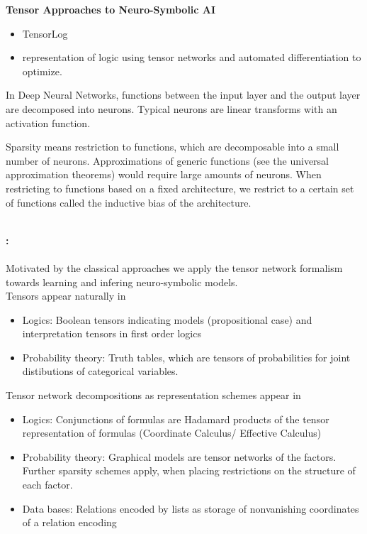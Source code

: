 \textbf{Tensor Approaches to Neuro-Symbolic AI}
\begin{itemize}
    \item TensorLog \cite{cohen_tensorlog_2020}
    \item \cite{badreddine_logic_2022} representation of logic using tensor networks and automated differentiation to optimize.
\end{itemize}

In Deep Neural Networks, functions between the input layer and the output layer are decomposed into neurons.
Typical neurons are linear transforms with an activation function.

Sparsity means restriction to functions, which are decomposable into a small number of neurons.
Approximations of generic functions (see the universal approximation theorems) would require large amounts of neurons. %
When restricting to functions based on a fixed architecture, we restrict to a certain set of functions called the inductive bias of the architecture.

\ \\
\textbf{: \parttwotext} \\
\ \\
Motivated by the classical approaches we apply the tensor network formalism towards learning and infering neuro-symbolic models. \\

Tensors appear naturally in
\begin{itemize}
    \item Logics: Boolean tensors indicating models (propositional case) and interpretation tensors in first order logics
    \item Probability theory: Truth tables, which are tensors of probabilities for joint distibutions of categorical variables.
\end{itemize}

Tensor network decompositions as representation schemes appear in
\begin{itemize}
    \item Logics: Conjunctions of formulas are Hadamard products of the tensor representation of formulas (Coordinate Calculus/ Effective Calculus)
    \item Probability theory: Graphical models are tensor networks of the factors. Further sparsity schemes apply, when placing restrictions on the structure of each factor.
    \item Data bases: Relations encoded by lists as storage of nonvanishing coordinates of a relation encoding
\end{itemize}

